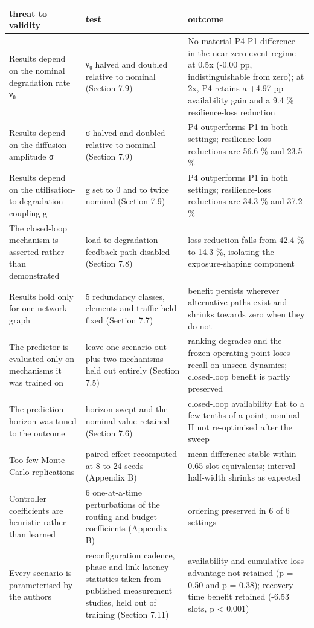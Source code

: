\begin{tabular}{lll}
\toprule
threat to validity & test & outcome \\
\midrule
Results depend on the nominal degradation rate ν₀ & ν₀ halved and doubled relative to nominal (Section 7.9) & No material P4-P1 difference in the near-zero-event regime at 0.5x (-0.00 pp, indistinguishable from zero); at 2x, P4 retains a +4.97 pp availability gain and a 9.4 \% resilience-loss reduction \\
Results depend on the diffusion amplitude σ & σ halved and doubled relative to nominal (Section 7.9) & P4 outperforms P1 in both settings; resilience-loss reductions are 56.6 \% and 23.5 \% \\
Results depend on the utilisation-to-degradation coupling g & g set to 0 and to twice nominal (Section 7.9) & P4 outperforms P1 in both settings; resilience-loss reductions are 34.3 \% and 37.2 \% \\
The closed-loop mechanism is asserted rather than demonstrated & load-to-degradation feedback path disabled (Section 7.8) & loss reduction falls from 42.4 \% to 14.3 \%, isolating the exposure-shaping component \\
Results hold only for one network graph & 5 redundancy classes, elements and traffic held fixed (Section 7.7) & benefit persists wherever alternative paths exist and shrinks towards zero when they do not \\
The predictor is evaluated only on mechanisms it was trained on & leave-one-scenario-out plus two mechanisms held out entirely (Section 7.5) & ranking degrades and the frozen operating point loses recall on unseen dynamics; closed-loop benefit is partly preserved \\
The prediction horizon was tuned to the outcome & horizon swept and the nominal value retained (Section 7.6) & closed-loop availability flat to a few tenths of a point; nominal H not re-optimised after the sweep \\
Too few Monte Carlo replications & paired effect recomputed at 8 to 24 seeds (Appendix B) & mean difference stable within 0.65 slot-equivalents; interval half-width shrinks as expected \\
Controller coefficients are heuristic rather than learned & 6 one-at-a-time perturbations of the routing and budget coefficients (Appendix B) & ordering preserved in 6 of 6 settings \\
Every scenario is parameterised by the authors & reconfiguration cadence, phase and link-latency statistics taken from published measurement studies, held out of training (Section 7.11) & availability and cumulative-loss advantage not retained (p = 0.50 and p = 0.38); recovery-time benefit retained (-6.53 slots, p < 0.001) \\
\bottomrule
\end{tabular}
